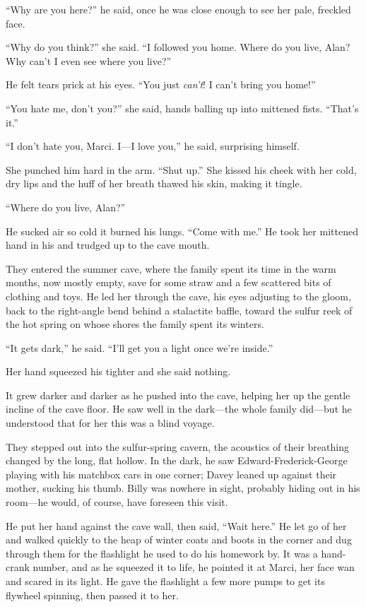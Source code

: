 \documentclass{article}
\begin{document}
``Why are you here?'' he said, once he was close enough to see her
pale, freckled face.

``Why do you think?'' she said.  ``I followed you home.  Where do you
live, Alan?  Why can't I even see where you live?''

He felt tears prick at his eyes.  ``You just \textit{can't}!  I can't
bring you home!''

``You hate me, don't you?'' she said, hands balling up into mittened
fists.  ``That's it.''

``I don't hate you, Marci.  I---I love you,'' he said, surprising
himself.

She punched him hard in the arm.  ``Shut up.'' She kissed his cheek
with her cold, dry lips and the huff of her breath thawed his skin,
making it tingle.

``Where do you live, Alan?''

He sucked air so cold it burned his lungs.  ``Come with me.'' He took
her mittened hand in his and trudged up to the cave mouth.

They entered the summer cave, where the family spent its time in the
warm months, now mostly empty, save for some straw and a few scattered
bits of clothing and toys.  He led her through the cave, his eyes
adjusting to the gloom, back to the right-angle bend behind a
stalactite baffle, toward the sulfur reek of the hot spring on whose
shores the family spent its winters.

``It gets dark,'' he said.  ``I'll get you a light once we're
inside.''

Her hand squeezed his tighter and she said nothing.

It grew darker and darker as he pushed into the cave, helping her up
the gentle incline of the cave floor.  He saw well in the dark---the
whole family did---but he understood that for her this was a blind
voyage.

They stepped out into the sulfur-spring cavern, the acoustics of their
breathing changed by the long, flat hollow.  In the dark, he saw
Edward-Frederick-George playing with his matchbox cars in one corner;
Davey leaned up against their mother, sucking his thumb.  Billy was
nowhere in sight, probably hiding out in his room---he would, of
course, have foreseen this visit.

He put her hand against the cave wall, then said, ``Wait here.'' He
let go of her and walked quickly to the heap of winter coats and boots
in the corner and dug through them for the flashlight he used to do
his homework by.  It was a hand-crank number, and as he squeezed it to
life, he pointed it at Marci, her face wan and scared in its light. 
He gave the flashlight a few more pumps to get its flywheel spinning,
then passed it to her.
\end{document}
